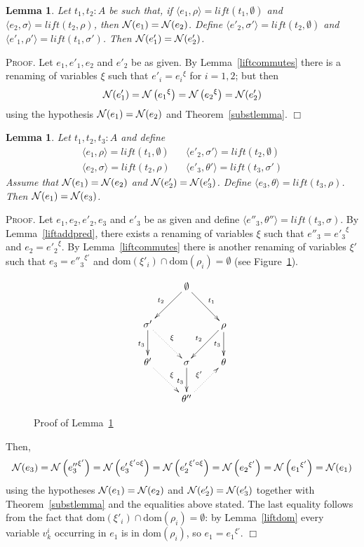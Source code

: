 \documentclass{article}
\newtheorem{lemma}[definition]{Lemma}
\newenvironment{proof}{\smallskip\textsc{Proof.}}{\hspace*{\fill}$\Box$}
\newcommand{\N}{{\cal N}}
\newcommand{\lift}{\ensuremath{\mathit{lift}}}
\newcommand{\dom}{\ensuremath{\mathrm{dom}}}
\newcommand{\renamevar}[2]{\ensuremath{{#1}^{#2}}}
\newcommand{\isrenamevar}[3]{\ensuremath{{#1}=\renamevar{#2}{#3}}}
\begin{document}
\begin{lemma}\label{set2}
Let $t_1,t_2:A$ be such that, if $\langle e_1,\rho\rangle=\lift(t_1,\emptyset)$
and $\langle e_2,\sigma\rangle=\lift(t_2,\rho)$, then $\N(e_1)=\N(e_2)$.
Define $\langle e'_2,\sigma'\rangle=\lift(t_2,\emptyset)$
and $\langle e'_1,\rho'\rangle=\lift(t_1,\sigma')$.  Then $\N(e'_1)=\N(e'_2)$.
\end{lemma}
\begin{proof}
Let $e_1,e'_1,e_2$ and $e'_2$ be as given.  By
Lemma~\ref{liftcommutes} there is a renaming of variables $\xi$ such
that {\isrenamevar{e'_i}{e_i}\xi} for $i=1,2$; but then
\[\N(e'_1)=\N\left(\renamevar{e_1}\xi\right)=%
\N\left(\renamevar{e_2}\xi\right)=\N(e'_2)\] using the hypothesis
$\N(e_1)=\N(e_2)$ and Theorem~\ref{substlemma}.
\end{proof}

\begin{lemma}\label{set3}
Let $t_1,t_2,t_3:A$ and define
\[\begin{array}{ccc}
\langle e_1,\rho\rangle=\lift(t_1,\emptyset)
 & & \langle e'_2,\sigma'\rangle=\lift(t_2,\emptyset) \\
\langle e_2,\sigma\rangle=\lift(t_2,\rho)
 & & \langle e'_3,\theta'\rangle=\lift(t_3,\sigma')
\end{array}\]
Assume that $\N(e_1)=\N(e_2)$ and $\N(e'_2)=\N(e'_3)$.  Define
$\langle e_3,\theta\rangle=\lift(t_3,\rho)$.  Then $\N(e_1)=\N(e_3)$.
\end{lemma}
\begin{proof}
Let $e_1,e_2,e'_2,e_3$ and $e'_3$ be as given and define
$\langle e''_3,\theta''\rangle=\lift(t_3,\sigma)$.
By Lemma~\ref{liftaddpred},
there exists a renaming of variables $\xi$ such that
$\isrenamevar{e''_3}{e'_3}\xi$ and $\isrenamevar{e_2}{e'_2}\xi$.
By Lemma~\ref{liftcommutes} there is another renaming of variables $\xi'$
such that $\isrenamevar{e_3}{e''_3}{\xi'}$ and
$\dom(\xi'_i)\cap\dom(\rho_i)=\emptyset$ (see Figure~\ref{fig:set3}).
\begin{figure}[htb]
\[\xymatrix{
 & \emptyset \ar[dl]_{t_2} \ar[dr]^{t_1} \\
 \sigma' \ar[d]_{t_3}\ar@{.>}[dr]^{\xi} & & \rho \ar[dl]_{t_2} \ar[d]_{t_3} \\
 \theta'\ar@{.>}[dr]^{\xi} & \sigma \ar[d]_{t_3} & \theta \\
 & \theta''\ar@{.>}[ur]^{\xi'}
}\]
\caption{Proof of Lemma~\ref{set3}}\label{fig:set3}
\end{figure}
Then,
\[\N(e_3)%
=\N\left(\renamevar{e''_3}{\xi'}\right)%
=\N\left(\renamevar{e'_3}{\xi'\circ\xi}\right)%
=\N\left(\renamevar{e'_2}{\xi'\circ\xi}\right)%
=\N\left(\renamevar{e_2}{\xi'}\right)%
=\N\left(\renamevar{e_1}{\xi'}\right)%
=\N(e_1)\]
using the hypotheses $\N(e_1)=\N(e_2)$ and $\N(e'_2)=\N(e'_3)$ together with 
Theorem~\ref{substlemma} and the equalities above stated.  The last equality
follows from the fact that $\dom(\xi'_i)\cap\dom(\rho_i)=\emptyset$: by
Lemma~\ref{liftdom} every variable $v^i_k$ occurring in $e_1$ is in
$\dom(\rho_i)$, so {\isrenamevar{e_1}{e_1}{\xi'}}.
\end{proof}
\end{document}
